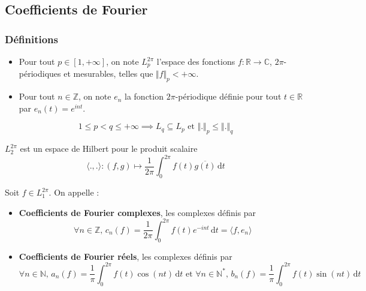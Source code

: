 




  \subsection{Coefficients de Fourier}

  \subsubsection{Définitions}


  \begin{notation}
    \begin{itemize}
      \item Pour tout $p \in [1, +\infty]$, on note $L_p^{2\pi}$ l'espace des fonctions $f : \mathbb{R} \rightarrow \mathbb{C}$, $2\pi$-périodiques et mesurables, telles que $\Vert f \Vert_p < +\infty$.
      \item Pour tout $n \in \mathbb{Z}$, on note $e_n$ la fonction $2\pi$-périodique définie pour tout $t \in \mathbb{R}$ par $e_n(t) = e^{int}$.
    \end{itemize}
  \end{notation}

  \begin{remark}
    \[ 1 \leq p < q \leq +\infty \implies L_q \subseteq L_p \text{ et } \Vert . \Vert_p \leq \Vert . \Vert_q \]
  \end{remark}

  \begin{proposition}
    $L_2^{2\pi}$ est un espace de Hilbert pour le produit scalaire
    \[ \langle ., . \rangle : (f, g) \mapsto \frac{1}{2 \pi} \int_0^{2\pi} f(t) \overline{g(t)} \, \mathrm{d}t \]
  \end{proposition}


  \begin{definition}
    Soit $f \in L_1^{2\pi}$. On appelle :
    \begin{itemize}
      \item \textbf{Coefficients de Fourier complexes}, les complexes définis par
      \[ \forall n \in \mathbb{Z}, \, c_n(f) = \frac{1}{2 \pi} \int_0^{2\pi} f(t) e^{-int} \, \mathrm{d}t = \langle f, e_n \rangle \]
      \item \textbf{Coefficients de Fourier réels}, les complexes définis par
      \[ \forall n \in \mathbb{N}, \, a_n(f) = \frac{1}{\pi} \int_0^{2\pi} f(t) \cos(nt) \, \mathrm{d}t \text{ et } \forall n \in \mathbb{N}^*, \, b_n(f) = \frac{1}{\pi} \int_0^{2\pi} f(t) \sin(nt) \, \mathrm{d}t \]
    \end{itemize}
  \end{definition}

